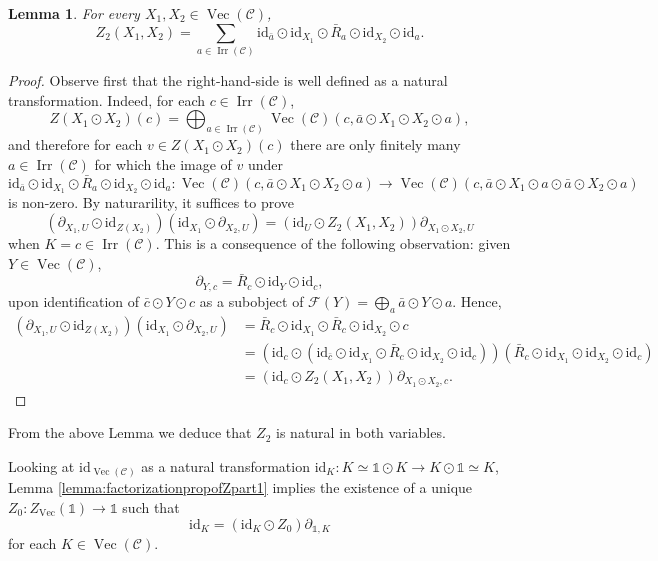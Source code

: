 \documentclass[a4paper,11pt,reqno]{amsart}
\numberwithin{equation}{section}
\newtheorem{lemma}[theorem]{Lemma}
\theoremstyle{remark}
\theoremstyle{definition}
\newcommand{\cC}{\mathcal C}
\newcommand{\cF}{\mathcal F}
\DeclareMathOperator{\Irr}{Irr}
\DeclareMathOperator{\Vect}{Vec}
\newcommand\un{{\mathds 1}}
\newcommand{\id}{\mathrm{id}}
\begin{document}
\begin{lemma}
	For every $X_1, X_2 \in \Vect(\cC)$, 
	\[
	Z_2(X_1,X_2) = \sum_{a \in \Irr(\cC)} \id_{\bar{a}} \odot \id_{X_1} \odot \bar{R}_a \odot \id_{X_2} \odot \id_{a} .
	\]
\end{lemma}
\begin{proof}
	Observe first that the right-hand-side is well defined as a natural transformation. Indeed, for each $c \in \Irr(\cC)$, 
	\[ Z(X_1 \odot X_2)(c) = \bigoplus_{a \in \Irr(\cC)} \Vect(\cC)(c, \bar{a} \odot X_1 \odot X_2 \odot a),
	\]
	and therefore for each $v \in Z(X_1 \odot X_2)(c)$ there are only finitely many $a \in \Irr(\cC)$ for which the image of $v$ under
	\[
	\id_{\bar{a}} \odot \id_{X_1} \odot \bar{R}_a \odot \id_{X_2} \odot \id_{a} : \Vect(\cC)(c, \bar{a} \odot X_1 \odot X_2 \odot a) \to \Vect(\cC)(c, \bar{a} \odot X_1 \odot a \odot \bar{a} \odot X_2 \odot a)
	\]
	is non-zero. By naturarility, it suffices to prove 
	\[
	(\partial_{X_1,U} \odot \id_{Z(X_2)})(\id_{X_1} \odot \partial_{X_2,U}) = (\id_U \odot Z_2(X_1,X_2)) \partial_{X_1 \odot X_2,U} 
	\]
	when $K = c \in \Irr(\cC)$. This is a consequence of the following observation: given $Y \in \Vect(\cC)$, 
	\[
	\partial_{Y,c} = \bar{R}_c \odot \id_Y \odot \id_c,
	\]
	upon identification of $\bar{c} \odot Y \odot c$ as a subobject of $\cF(Y) = \bigoplus_a \bar{a} \odot Y \odot a$. Hence,
	\begin{align*}
	(\partial_{X_1,U} \odot \id_{Z(X_2)})(\id_{X_1} \odot \partial_{X_2,U}) &= \bar{R}_c \odot \id_{X_1} \odot \bar{R}_c \odot \id_{X_2} \odot c \\
	& = (\id_c \odot (\id_{\bar{c}} \odot \id_{X_1} \odot \bar{R}_c \odot \id_{X_2} \odot \id_c))(\bar{R}_c \odot \id_{X_1} \odot \id_{X_2} \odot \id_c)\\
	& = (\id_c \odot Z_2(X_1,X_2)) \partial_{X_1 \odot X_2,c} .
	\end{align*}
\end{proof}	

From the above Lemma we deduce that $Z_2$ is natural in both variables.
\medskip

Looking at $\id_{\Vect(\cC)}$ as a natural transformation $\id_K: K \simeq \un \odot K \to K \odot \un \simeq K$, Lemma \ref{lemma:factorizationpropofZpart1} implies the existence of a unique $Z_0: Z_{\Vect}(\un) \to \un$ such that 
$$\id_K = (\id_K \odot Z_0) \partial_{\un,K}$$
for each $K \in \Vect(\cC)$.
\end{document}
